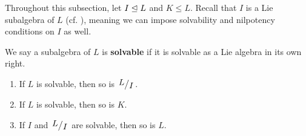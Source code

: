 Throughout this subsection, let $I \trianglelefteq L$ and $K \leq L$. Recall that $I$ is a Lie subalgebra of $L$ (cf. ), meaning we can impose solvability and nilpotency conditions on $I$ as well.

\begin{boxdefinition}
    We say a subalgebra of $L$ is \textbf{solvable} if it is solvable as a Lie algebra in its own right.
\end{boxdefinition}

\begin{boxproposition}\label{Ch1:Prop:SolvabilityConditions}
    \hfill
    \begin{enumerate}[label = \normalfont\arabic*., noitemsep]
        \item If $L$ is solvable, then so is $\quotient{L}{I}$.
        \item If $L$ is solvable, then so is $K$.
        \item If $I$ and $\quotient{L}{I}$ are solvable, then so is $L$.
    \end{enumerate}
\end{boxproposition}
